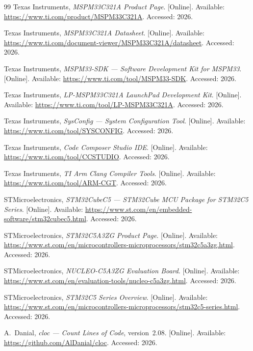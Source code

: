 \documentclass[12pt,a4paper,oneside]{book}
\begin{document}
\begin{thebibliography}{99}
Texas Instruments, \emph{MSPM33C321A Product Page}. [Online]. Available: \url{https://www.ti.com/product/MSPM33C321A}. Accessed: 2026.

Texas Instruments, \emph{MSPM33C321A Datasheet}. [Online]. Available: \url{https://www.ti.com/document-viewer/MSPM33C321A/datasheet}. Accessed: 2026.

Texas Instruments, \emph{MSPM33-SDK --- Software Development Kit for MSPM33}. [Online]. Available: \url{https://www.ti.com/tool/MSPM33-SDK}. Accessed: 2026.

Texas Instruments, \emph{LP-MSPM33C321A LaunchPad Development Kit}. [Online]. Available: \url{https://www.ti.com/tool/LP-MSPM33C321A}. Accessed: 2026.

Texas Instruments, \emph{SysConfig --- System Configuration Tool}. [Online]. Available: \url{https://www.ti.com/tool/SYSCONFIG}. Accessed: 2026.

Texas Instruments, \emph{Code Composer Studio IDE}. [Online]. Available: \url{https://www.ti.com/tool/CCSTUDIO}. Accessed: 2026.

Texas Instruments, \emph{TI Arm Clang Compiler Tools}. [Online]. Available: \url{https://www.ti.com/tool/ARM-CGT}. Accessed: 2026.

STMicroelectronics, \emph{STM32CubeC5 --- STM32Cube MCU Package for STM32C5 Series}. [Online]. Available: \url{https://www.st.com/en/embedded-software/stm32cubec5.html}. Accessed: 2026.

STMicroelectronics, \emph{STM32C5A3ZG Product Page}. [Online]. Available: \url{https://www.st.com/en/microcontrollers-microprocessors/stm32c5a3zg.html}. Accessed: 2026.

STMicroelectronics, \emph{NUCLEO-C5A3ZG Evaluation Board}. [Online]. Available: \url{https://www.st.com/en/evaluation-tools/nucleo-c5a3zg.html}. Accessed: 2026.

STMicroelectronics, \emph{STM32C5 Series Overview}. [Online]. Available: \url{https://www.st.com/en/microcontrollers-microprocessors/stm32c5-series.html}. Accessed: 2026.

A.~Danial, \emph{cloc --- Count Lines of Code}, version~2.08. [Online]. Available: \url{https://github.com/AlDanial/cloc}. Accessed: 2026.


\end{thebibliography}
\end{document}
